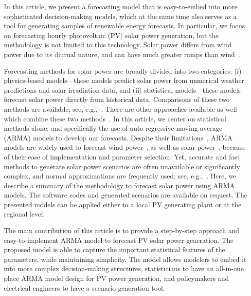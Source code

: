 \documentclass[review]{elsarticle}
\begin{document}
In this article, we present a forecasting model that is easy-to-embed into more 
sophisticated decision-making models, which at the same time also serves as a 
tool for generating samples of renewable energy forecasts.  In 
particular, we focus on 
forecasting  hourly photovoltaic  (PV) solar power generation, but the 
methodology is not 
limited to this technology.  Solar power differs from wind power due 
to its diurnal nature, and can have much greater  ramps than 
wind~\cite{graabak2016variability}. 

Forecasting methods for solar power are broadly divided 
into two categories: (i) physics-based models---these models predict solar 
power 
from numerical weather predictions and solar irradiation data, and (ii) 
statistical models---these 
models forecast 
solar power directly from historical data. Comparisons of these two 
methods are available; see, 
e.g.,~\cite{huang2010comparative,inman2013solar}. There are other 
approaches available as well which combine these two 
methods~\cite{dong2015novel}. 
In this article, we center on  statistical  methods alone, and specifically the 
use of auto-regressive moving average (ARMA) 
models to develop our forecasts. 
Despite 
their limitations~\cite{yang2018history}, ARMA models
are widely used to forecast wind power~\cite{brown1984time, 
duran2007short}, as well as solar 
power~\cite{mora1998multiplicative,yang2012hourly}, because of their ease of 
implementation and parameter selection.  Yet, accurate and 
fast methods to generate solar power scenarios are often unavailable or 
significantly complex, and normal approximations are frequently used; see, 
e.g.,~\cite{su2014stochastic}. 
Here, 
we describe a summary of the methodology to forecast solar power using 
ARMA models. The software codes and generated scenarios are 
available on request. The presented models can 
be applied either to a local PV generating plant or  at the regional 
level.


The main contribution of this article is to provide a step-by-step approach and 
easy-to-implement ARMA model to forecast PV solar power generation. The 
proposed model is able to capture the important statistical features of the 
parameters, while maintaining simplicity. The model allows modelers to embed
it into more complex decision-making structures, statisticians to have an 
all-in-one place ARMA model design for PV power generation, and policymakers and electrical engineers to have a scenario generation tool. 
\end{document}
